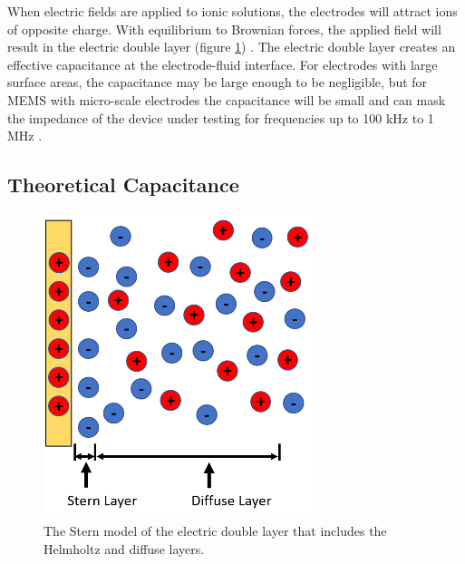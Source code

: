 \par When electric fields are applied to ionic solutions, the electrodes will attract ions of opposite charge. With equilibrium to Brownian forces, the applied field will result in the electric double layer (figure \ref{fig:electric_double_layer}) \cite{ishai_electrode_2013}. The electric double layer creates an effective capacitance at the electrode-fluid interface. For electrodes with large surface areas, the capacitance may be large enough to be negligible, but for MEMS with micro-scale electrodes the capacitance will be small and can mask the impedance of the device under testing for frequencies up to 100 kHz to 1 MHz \cite{bordi_reduction_2001}. 

\subsection{Theoretical Capacitance}


\begin{figure}[h]
    \centering
    \includegraphics[width=0.7\textwidth]{images/electricDoubleLayer.png}
    \caption[Stern model of the electric double layer]{The Stern model of the electric double layer that includes the Helmholtz and diffuse layers.}
    \label{fig:electric_double_layer}
\end{figure}

